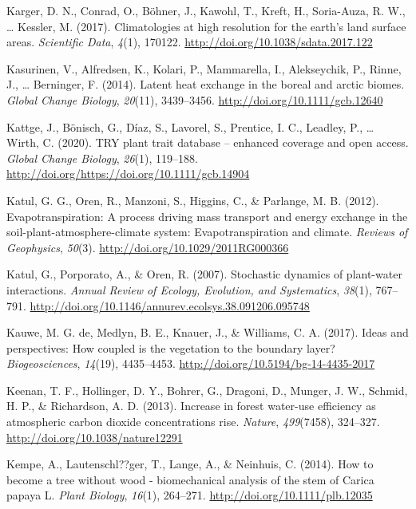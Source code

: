 \documentclass[11pt,twoside]{reedthesis}
\begin{document}
\hypertarget{ref-karger_climatologies_2017}{}
Karger, D. N., Conrad, O., Böhner, J., Kawohl, T., Kreft, H.,
Soria-Auza, R. W., \ldots{} Kessler, M. (2017). Climatologies at high
resolution for the earth's land surface areas. \emph{Scientific Data},
\emph{4}(1), 170122. \url{http://doi.org/10.1038/sdata.2017.122}

\hypertarget{ref-kasurinen_latent_2014}{}
Kasurinen, V., Alfredsen, K., Kolari, P., Mammarella, I., Alekseychik,
P., Rinne, J., \ldots{} Berninger, F. (2014). Latent heat exchange in
the boreal and arctic biomes. \emph{Global Change Biology},
\emph{20}(11), 3439--3456. \url{http://doi.org/10.1111/gcb.12640}

\hypertarget{ref-Kattge2020}{}
Kattge, J., Bönisch, G., Díaz, S., Lavorel, S., Prentice, I. C.,
Leadley, P., \ldots{} Wirth, C. (2020). TRY plant trait database --
enhanced coverage and open access. \emph{Global Change Biology},
\emph{26}(1), 119--188.
\url{http://doi.org/https://doi.org/10.1111/gcb.14904}

\hypertarget{ref-katul_evapotranspiration_2012}{}
Katul, G. G., Oren, R., Manzoni, S., Higgins, C., \& Parlange, M. B.
(2012). Evapotranspiration: A process driving mass transport and energy
exchange in the soil-plant-atmosphere-climate system: Evapotranspiration
and climate. \emph{Reviews of Geophysics}, \emph{50}(3).
\url{http://doi.org/10.1029/2011RG000366}

\hypertarget{ref-Katul2007}{}
Katul, G., Porporato, A., \& Oren, R. (2007). Stochastic dynamics of
plant-water interactions. \emph{Annual Review of Ecology, Evolution, and
Systematics}, \emph{38}(1), 767--791.
\url{http://doi.org/10.1146/annurev.ecolsys.38.091206.095748}

\hypertarget{ref-de_kauwe_ideas_2017}{}
Kauwe, M. G. de, Medlyn, B. E., Knauer, J., \& Williams, C. A. (2017).
Ideas and perspectives: How coupled is the vegetation to the boundary
layer? \emph{Biogeosciences}, \emph{14}(19), 4435--4453.
\url{http://doi.org/10.5194/bg-14-4435-2017}

\hypertarget{ref-Keenan2013}{}
Keenan, T. F., Hollinger, D. Y., Bohrer, G., Dragoni, D., Munger, J. W.,
Schmid, H. P., \& Richardson, A. D. (2013). Increase in forest water-use
efficiency as atmospheric carbon dioxide concentrations rise.
\emph{Nature}, \emph{499}(7458), 324--327.
\url{http://doi.org/10.1038/nature12291}

\hypertarget{ref-Kempe2014}{}
Kempe, A., Lautenschl??ger, T., Lange, A., \& Neinhuis, C. (2014). How
to become a tree without wood - biomechanical analysis of the stem of
Carica papaya L. \emph{Plant Biology}, \emph{16}(1), 264--271.
\url{http://doi.org/10.1111/plb.12035}
\end{document}
